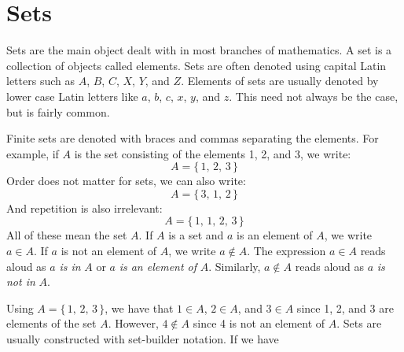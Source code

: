 \documentclass{article}
\theoremstyle{plain}
\theoremstyle{normal}
\newenvironment{example}{%
    \pushQED{\qed}\renewcommand{\qedsymbol}{$\blacksquare$}\examplex%
}{%
    \popQED\endexamplex%
}
\newenvironment{definition}{%
    \pushQED{\qed}\renewcommand{\qedsymbol}{$\blacksquare$}\definitionx%
}{%
    \popQED\enddefinitionx%
}
\newenvironment{notation}{%
    \pushQED{\qed}\renewcommand{\qedsymbol}{$\blacksquare$}\notationx%
}{%
    \popQED\endnotationx%
}
\begin{document}
    \section{Sets}
        Sets are the main object dealt with in most branches of mathematics.
        \begin{definition}[\textbf{Set}]
            A set is a collection of objects called elements.
        \end{definition}
        Sets are often denoted using capital Latin letters such as
        $A$, $B$, $C$, $X$, $Y$, and $Z$. Elements of sets are usually denoted
        by lower case Latin letters like $a$, $b$, $c$, $x$, $y$, and $z$. This
        need not always be the case, but is fairly common.
        \begin{example}
            Finite sets are denoted with braces and commas separating the
            elements. For example, if $A$ is the set consisting of the elements
            1, 2, and 3, we write:
            \begin{equation}
                A=\{\,1,\,2,\,3\,\}
            \end{equation}
            Order does not matter for sets, we can also write:
            \begin{equation}
                A=\{\,3,\,1,\,2\,\}
            \end{equation}
            And repetition is also irrelevant:
            \begin{equation}
                A=\{\,1,\,1,\,2,\,3\,\}
            \end{equation}
            All of these mean the set $A$.
        \end{example}
        \begin{notation}[\textbf{Containment}]
            If $A$ is a set and $a$ is an element of $A$, we write
            $a\in{A}$. If $a$ is not an element of $A$, we write
            $a\notin{A}$.
        \end{notation}
        The expression $a\in{A}$ reads aloud as
        $a$ \textit{is in} $A$ or $a$ \textit{is an element of} $A$. Similarly,
        $a\notin{A}$ reads aloud as $a$ \textit{is not in} $A$.
        \begin{example}
            Using $A=\{\,1,\,2,\,3\,\}$, we have that
            $1\in{A}$, $2\in{A}$, and $3\in{A}$ since 1, 2, and 3 are elements
            of the set $A$. However, $4\notin{A}$ since 4 is not an element of
            $A$.
        \end{example}
        Sets are usually constructed with set-builder notation. If we have
\end{document}
